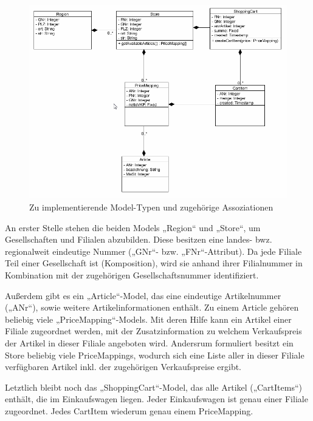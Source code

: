 \begin{figure}[H]
\includegraphics[width=\linewidth]{res/models.png}
\caption{Zu implementierende Model-Typen und zugehörige Assoziationen}\label{abb:models}
\end{figure}


An erster Stelle stehen die beiden Models „Region“ und „Store“, um Gesellschaften und Filialen abzubilden. Diese besitzen eine landes- bwz. regionalweit eindeutige Nummer („GNr“- bzw. „FNr“-Attribut). Da jede Filiale Teil einer Gesellschaft ist (Komposition), wird sie anhand ihrer Filialnummer in Kombination mit der zugehörigen Gesellschaftsnummer identifiziert.

Außerdem gibt es ein „Article“-Model, das eine eindeutige Artikelnummer („ANr“), sowie weitere Artikelinformationen enthält. Zu einem Article gehören beliebig viele „PriceMapping“-Models. Mit deren Hilfe kann ein Artikel einer Filiale zugeordnet werden, mit der Zusatzinformation zu welchem Verkaufspreis der Artikel in dieser Filiale angeboten wird. Andersrum formuliert besitzt ein Store beliebig viele PriceMappings, wodurch sich eine Liste aller in dieser Filiale verfügbaren Artikel inkl. der zugehörigen Verkaufspreise ergibt.

Letztlich bleibt noch das „ShoppingCart“-Model, das alle Artikel („CartItems“) enthält, die im Einkaufswagen liegen. Jeder Einkaufswagen ist genau einer Filiale zugeordnet. Jedes CartItem wiederum genau einem PriceMapping.

